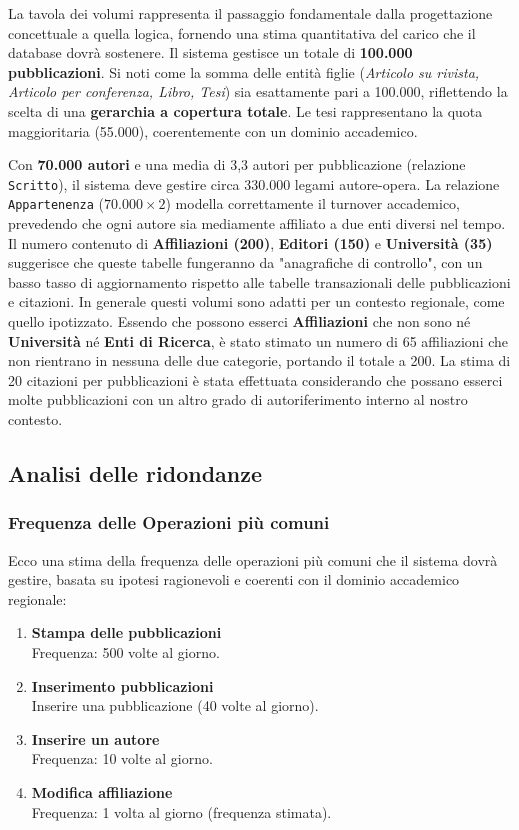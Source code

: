 \documentclass[a4paper,12pt]{article}
\begin{document}
\medskip

La tavola dei volumi rappresenta il passaggio fondamentale dalla progettazione concettuale a quella logica, fornendo una stima quantitativa del carico che il database dovrà sostenere. Il sistema gestisce un totale di \textbf{100.000 pubblicazioni}. Si noti come la somma delle entità figlie (\textit{Articolo su rivista, Articolo per conferenza, Libro, Tesi}) sia esattamente pari a 100.000, riflettendo la scelta di una \textbf{gerarchia a copertura totale}. Le tesi rappresentano la quota maggioritaria (55.000), coerentemente con un dominio accademico.

Con \textbf{70.000 autori} e una media di 3,3 autori per pubblicazione (relazione \texttt{Scritto}), il sistema deve gestire circa 330.000 legami autore-opera. La relazione \texttt{Appartenenza} ($70.000 \times 2$) modella correttamente il turnover accademico, prevedendo che ogni autore sia mediamente affiliato a due enti diversi nel tempo.
Il numero contenuto di \textbf{Affiliazioni (200)}, \textbf{Editori (150)} e \textbf{Università (35)} suggerisce che queste tabelle fungeranno da "anagrafiche di controllo", con un basso tasso di aggiornamento rispetto alle tabelle transazionali delle pubblicazioni e citazioni. In generale questi volumi sono adatti per un contesto regionale, come quello ipotizzato. Essendo che possono esserci \textbf{Affiliazioni} che non sono né \textbf{Università} né \textbf{Enti di Ricerca}, è stato stimato un numero di 65 affiliazioni che non rientrano in nessuna delle due categorie, portando il totale a 200.
La stima di 20 citazioni per pubblicazioni è stata effettuata considerando che possano esserci molte pubblicazioni con un altro grado di autoriferimento interno al nostro contesto.
\subsection{Analisi delle ridondanze} \label{subsec:analisi-ridondanze}
\subsubsection*{Frequenza delle Operazioni più comuni}
Ecco una stima della frequenza delle operazioni più comuni che il sistema dovrà gestire, basata su ipotesi ragionevoli e coerenti con il dominio accademico regionale:
\begin{enumerate}[label=\textbf{OP\arabic*}, start=1, leftmargin=1.5cm]
    \item \textbf{Stampa delle pubblicazioni} \\
    Frequenza: 500 volte al giorno.
    
    \item \textbf{Inserimento pubblicazioni} \\
    Inserire una pubblicazione (40 volte al giorno). \\
    \item \textbf{Inserire un autore} \\
    Frequenza: 10 volte al giorno.
    \item \textbf{Modifica affiliazione} \\
    Frequenza: 1 volta al giorno (frequenza stimata).
\end{enumerate}
\end{document}
